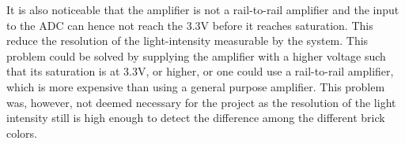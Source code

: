 It is also noticeable that the amplifier is not a rail-to-rail amplifier and the input to the ADC can hence not reach the 3.3V before it reaches saturation.
This reduce the resolution of the light-intensity measurable by the system.
This problem could be solved by supplying the amplifier with a higher voltage such that its saturation is at 3.3V, or higher, or one could use a rail-to-rail amplifier, which is more expensive than using a general purpose amplifier.
This problem was, however, not deemed necessary for the project as the resolution of the light intensity still is high enough to detect the difference among the different brick colors.




